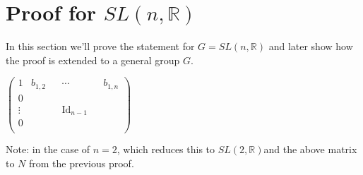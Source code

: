 \documentclass[
]{article}
\theoremstyle{break}
\theoremstyle{plain}
\newcommand{\G}{\ensuremath{G}}
\newcommand{\sltr}{\ensuremath{SL(2, \mathbb{R})}}
\newcommand{\slnr}{\ensuremath{SL(n, \mathbb{R})}}
\begin{document}

\hypertarget{proof-for-slnr}{%
  \section{Proof for \texorpdfstring{$SL(n, \mathbb{R})$}{SL(n, R)}}
\label{proof-for-slnr}}

In this section we'll prove the statement for $G = \slnr$ and later show how the proof is extended to a general group \G.


\begin{math}
  \begin{pmatrix}
    1 & b_{1,2} & & \cdots & & b_{1,n} \\
    0 & & &  & \\
    \vdots & & & \text{Id}_{n-1} & \\
    0 & & & & \\
  \end{pmatrix}
\end{math}

Note: in the case of $n = 2$, which reduces this to \sltr and the above matrix to $N$ from the previous proof.
\end{document}
